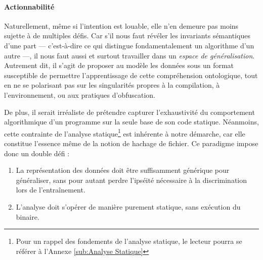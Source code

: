 \paragraph{Actionnabilité}\label{par:Actionnabilité} %
Naturellement, même si l'intention est louable, elle n'en demeure pas moins sujette à de multiples défis. 
Car s'il nous faut révéler les invariants sémantiques d'une part — c'est-à-dire ce qui distingue fondamentalement un algorithme d'un autre —, il nous faut aussi et surtout travailler dans un \textit{espace de généralisation}. 
Autrement dit, il s'agit de proposer au modèle les données sous un format susceptible de permettre l'apprentissage de cette compréhension ontologique, tout en ne se polarisant pas sur les singularités propres à la compilation, à l'environnement, ou aux pratiques d'obfuscation.

De plus, il serait irréaliste de prétendre capturer l'exhaustivité du comportement algorithmique d'un programme sur la seule base de son code statique. Néanmoins, cette contrainte de l'analyse statique\footnote{Pour un rappel des fondements de l'analyse statique, le lecteur pourra se référer à l'Annexe \ref{sub:Analyse Statique}} est inhérente à notre démarche, car elle constitue l'essence même de la notion de hachage de fichier. Ce paradigme impose donc un double défi :
\begin{enumerate}
  \item La représentation des données doit être suffisamment générique pour généraliser, sans pour autant perdre l'ipséité nécessaire à la discrimination lors de l'entraînement.
  \item L'analyse doit s'opérer de manière purement statique, sans exécution du binaire.
\end{enumerate}

